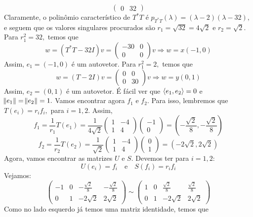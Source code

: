 \documentclass[11pt,a4paper]{article}
\begin{document}
{{\[\begin{pmatrix}
0& 32
\end{pmatrix}\]
Claramente, o polinômio característico de $T^{*}T$ é $p_{T^{*}T}(\lambda) = (\lambda - 2)(\lambda - 32),$ e seguem que os valores singulares procurados são $r_1 = \sqrt{32} = 4 \sqrt{2}$ e $r_2 = \sqrt{2}.$
Para $r_1^2 = 32,$ temos que
\[
w = (T^{*}T - 32I)v = \left(\begin{matrix}
-30 & 0 \\
0 & 0
\end{matrix}\right)v \Rightarrow w = x(-1,0)
\]
Assim, $e_1 = (-1,0)$ é um autovetor.
Para $r_1^2 = 2,$ temos que
\[
w = (T - 2I)v = \left(\begin{matrix}
0 & 0 \\
0 & 30
\end{matrix}\right)v \Rightarrow w = y(0,1)
\]
Assim, $e_2 = (0,1)$ é um autovetor.
É fácil ver que $\left\langle e_1, e_2 \right\rangle = 0$ e $\norm{e_1} = \norm{e_2} = 1.$
Vamos encontrar agora $f_1$ e $f_2.$ Para isso, lembremos que $T(e_i) = r_i f_i,$ para $i = 1,2.$ Assim,
\[
f_1 = \frac{1}{r_1} T(e_1) = \frac{1}{4 \sqrt{2}} \begin{pmatrix}
1 & -4 \\
1 & 4
\end{pmatrix} \begin{pmatrix} -1 \\ 0 \end{pmatrix} = \left( -\frac{\sqrt{2}}{8}, -\frac{\sqrt{2}}{8} \right)
\]
\[
f_2 = \frac{1}{r_2} T(e_2) = \frac{1}{\sqrt{2}} \begin{pmatrix}
1 & -4 \\
1 & 4
\end{pmatrix} \begin{pmatrix} 0 \\ 1 \end{pmatrix} = \left( -2 \sqrt{2}, 2\sqrt{2} \right) 
\]
Agora, vamos encontrar as matrizes $U$ e $S.$ Devemos ter para $i = 1, 2:$
\[
U(e_i) = f_i \quad \mbox{e} \quad S(f_i) = r_if_i
\]
Vejamos:
\[
\left(\begin{array}{cc|cc}
-1 & 0 & -\frac{\sqrt{2}}{8} & -\frac{\sqrt{2}}{8} \\
0 & 1 &  -2 \sqrt{2} &  2\sqrt{2}
\end{array} \right) \sim \left(\begin{array}{cc|cc}
1 & 0 & \frac{\sqrt{2}}{8} & \frac{\sqrt{2}}{8} \\
0 & 1 &  -2 \sqrt{2} &  2\sqrt{2}
\end{array} \right)
\]
Como no lado esquerdo já temos uma matriz identidade, temos que
}}
\end{document}
